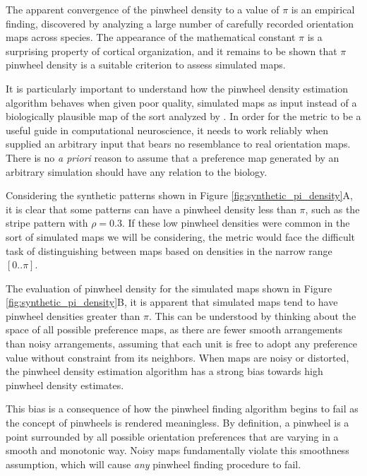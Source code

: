 \documentclass[phd,ianc,twoside]{infthesis}
\begin{document}
The apparent convergence of the pinwheel density to a value of $\pi$ is
an empirical finding, discovered by analyzing a large number of
carefully recorded orientation maps across species. The appearance of
the mathematical constant $\pi$ is a surprising property of cortical
organization, and it remains to be shown that $\pi$ pinwheel density
is a suitable criterion to assess simulated maps.

It is particularly important to understand how the pinwheel density
estimation algorithm behaves when given poor quality, simulated maps as
input instead of a biologically plausible map of the sort analyzed by
\citet{kaschube_science10}. In order for the metric to be a useful guide
in computational neuroscience, it needs to work reliably when supplied an
arbitrary input that bears no resemblance to real orientation
maps. There is no \emph{a priori} reason to assume that a preference map
generated by an arbitrary simulation should have any relation to the
biology.

Considering the synthetic patterns shown in Figure
\ref{fig:synthetic_pi_density}A, it is clear that some patterns can have
a pinwheel density less than $\pi$, such as the stripe pattern with
$\rho=0.3$. If these low pinwheel densities were common in the sort of
simulated maps we will be considering, the metric would face the
difficult task of distinguishing between maps based on densities in the
narrow range $[0..\pi]$.

The evaluation of pinwheel density for the simulated maps shown in
Figure \ref{fig:synthetic_pi_density}B, it is apparent that simulated
maps tend to have pinwheel densities greater than $\pi$. This can be
understood by thinking about the space of all possible preference maps,
as there are fewer smooth arrangements than noisy arrangements, assuming
that each unit is free to adopt any preference value without constraint
from its neighbors. When maps are noisy or distorted, the pinwheel
density estimation algorithm has a strong bias towards high
pinwheel density estimates.

This bias is a consequence of how the pinwheel finding algorithm begins
to fail as the concept of pinwheels is rendered meaningless. By
definition, a pinwheel is a point surrounded by all possible orientation
preferences that are varying in a smooth and monotonic way. Noisy maps
fundamentally violate this smoothness assumption, which will cause
\emph{any} pinwheel finding procedure to fail.
\end{document}

